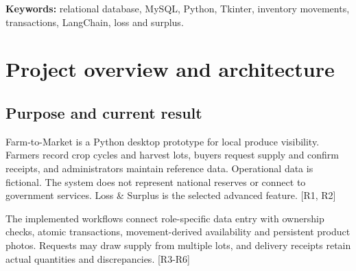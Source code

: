 \documentclass[12pt,a4paper]{report}
\begin{document}
\textbf{Keywords:} relational database, MySQL, Python, Tkinter, inventory movements, transactions, LangChain, loss and surplus.
\clearpage\begingroup\small{}\tableofcontents\endgroup\clearpage
{}


\chapter{Project overview and architecture}

\section{Purpose and current result}
Farm-to-Market is a Python desktop prototype for local produce visibility. Farmers record crop cycles and harvest lots, buyers request supply and confirm receipts, and administrators maintain reference data. Operational data is fictional. The system does not represent national reserves or connect to government services. Loss \& Surplus is the selected advanced feature. [R1, R2]

The implemented workflows connect role-specific data entry with ownership checks, atomic transactions, movement-derived availability and persistent product photos. Requests may draw supply from multiple lots, and delivery receipts retain actual quantities and discrepancies. [R3-R6]
\end{document}

